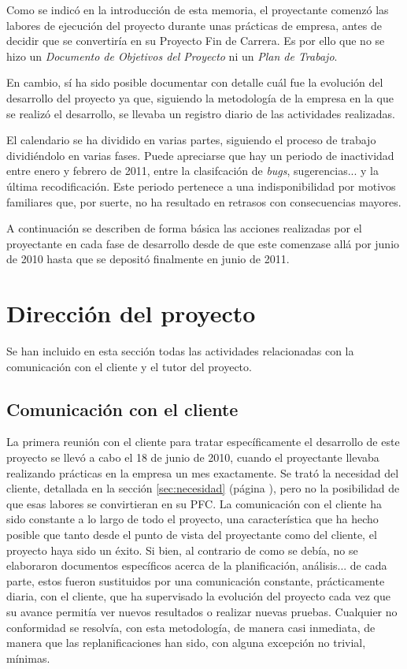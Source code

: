 Como se indicó en la introducción de esta memoria, el proyectante comenzó las
labores de ejecución del proyecto durante unas prácticas de empresa, antes de
decidir que se convertiría en su Proyecto Fin de Carrera. Es por ello que no se
hizo un \textit{Documento de Objetivos del Proyecto} ni un \textit{Plan de
Trabajo}.

En cambio, sí ha sido posible documentar con detalle cuál fue la evolución del
desarrollo del proyecto ya que, siguiendo la metodología de la empresa en la
que se realizó el desarrollo, se llevaba un registro diario de las actividades
realizadas.

El calendario se ha dividido en varias partes, siguiendo el proceso de trabajo
dividiéndolo en varias fases. Puede apreciarse que hay un periodo de
inactividad entre enero y febrero de 2011, entre la clasifcación de
\textit{bugs}, sugerencias... y la última recodificación. Este periodo
pertenece a una indisponibilidad por motivos familiares que, por suerte, no ha
resultado en retrasos con consecuencias mayores.

A continuación se describen de forma básica las acciones realizadas
por el proyectante en cada fase de desarrollo desde de que este comenzase allá
por junio de 2010 hasta que se depositó finalmente en junio de 2011.

\section{Dirección del proyecto}

Se han incluido en esta sección todas las
actividades relacionadas con la comunicación con el cliente y el tutor del
proyecto.

\subsection{Comunicación con el cliente}

La primera reunión con el cliente para tratar específicamente el desarrollo de
este proyecto se llevó a cabo el 18 de junio de 2010, cuando el proyectante
llevaba realizando prácticas en la empresa un mes exactamente. Se trató la
necesidad del cliente, detallada en la sección \ref{sec:necesidad} (página
\pageref{sec:necesidad}), pero no la posibilidad de que esas labores se
convirtieran en su PFC.
La comunicación con el cliente ha sido constante a lo largo de todo el
proyecto, una característica que ha hecho posible que tanto desde el punto de
vista del proyectante como del cliente, el proyecto haya sido un éxito. Si
bien, al contrario de como se debía, no se elaboraron documentos específicos
acerca de la planificación, análisis... de cada parte, estos fueron sustituidos
por una comunicación constante, prácticamente diaria, con el cliente, que ha
supervisado la evolución del proyecto cada vez que su avance permitía ver
nuevos resultados o realizar nuevas pruebas. Cualquier no conformidad se
resolvía, con esta metodología, de manera casi inmediata, de manera que las
replanificaciones han sido, con alguna excepción no trivial, mínimas.

